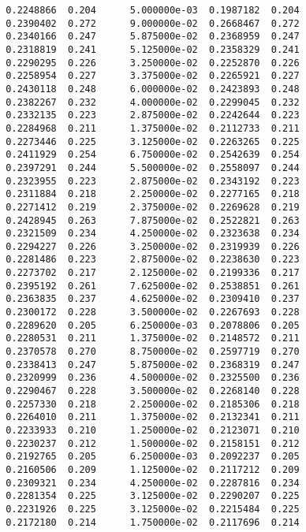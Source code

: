 \documentclass[
  letterpaper,
  DIV=11,
  numbers=noendperiod]{scrartcl}
\begin{document}
\begin{verbatim}
  0.2248866  0.204      5.000000e-03  0.1987182  0.204           
  0.2390402  0.272      9.000000e-02  0.2668467  0.272           
  0.2340166  0.247      5.875000e-02  0.2368959  0.247           
  0.2318819  0.241      5.125000e-02  0.2358329  0.241           
  0.2290295  0.226      3.250000e-02  0.2252870  0.226           
  0.2258954  0.227      3.375000e-02  0.2265921  0.227           
  0.2430118  0.248      6.000000e-02  0.2423893  0.248           
  0.2382267  0.232      4.000000e-02  0.2299045  0.232           
  0.2332135  0.223      2.875000e-02  0.2242644  0.223           
  0.2284968  0.211      1.375000e-02  0.2112733  0.211           
  0.2273446  0.225      3.125000e-02  0.2263265  0.225           
  0.2411929  0.254      6.750000e-02  0.2542639  0.254           
  0.2397291  0.244      5.500000e-02  0.2558097  0.244           
  0.2323955  0.223      2.875000e-02  0.2343192  0.223           
  0.2311884  0.218      2.250000e-02  0.2277165  0.218           
  0.2271412  0.219      2.375000e-02  0.2269628  0.219           
  0.2428945  0.263      7.875000e-02  0.2522821  0.263           
  0.2321509  0.234      4.250000e-02  0.2323638  0.234           
  0.2294227  0.226      3.250000e-02  0.2319939  0.226           
  0.2281486  0.223      2.875000e-02  0.2238630  0.223           
  0.2273702  0.217      2.125000e-02  0.2199336  0.217           
  0.2395192  0.261      7.625000e-02  0.2538851  0.261           
  0.2363835  0.237      4.625000e-02  0.2309410  0.237           
  0.2300172  0.228      3.500000e-02  0.2267693  0.228           
  0.2289620  0.205      6.250000e-03  0.2078806  0.205           
  0.2280531  0.211      1.375000e-02  0.2148572  0.211           
  0.2370578  0.270      8.750000e-02  0.2597719  0.270           
  0.2338413  0.247      5.875000e-02  0.2368319  0.247           
  0.2320999  0.236      4.500000e-02  0.2325500  0.236           
  0.2290467  0.228      3.500000e-02  0.2268140  0.228           
  0.2257330  0.218      2.250000e-02  0.2185306  0.218           
  0.2264010  0.211      1.375000e-02  0.2132341  0.211           
  0.2233933  0.210      1.250000e-02  0.2123071  0.210           
  0.2230237  0.212      1.500000e-02  0.2158151  0.212           
  0.2192765  0.205      6.250000e-03  0.2092237  0.205           
  0.2160506  0.209      1.125000e-02  0.2117212  0.209           
  0.2309321  0.234      4.250000e-02  0.2287816  0.234           
  0.2281354  0.225      3.125000e-02  0.2290207  0.225           
  0.2231926  0.225      3.125000e-02  0.2215484  0.225           
  0.2172180  0.214      1.750000e-02  0.2117696  0.214           

\end{verbatim}
\end{document}
